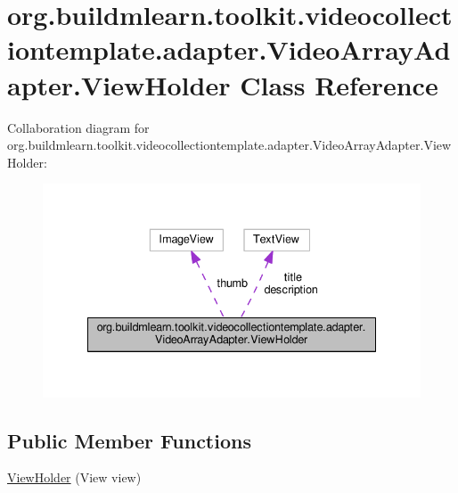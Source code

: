 \hypertarget{classorg_1_1buildmlearn_1_1toolkit_1_1videocollectiontemplate_1_1adapter_1_1VideoArrayAdapter_1_1ViewHolder}{}\section{org.\+buildmlearn.\+toolkit.\+videocollectiontemplate.\+adapter.\+Video\+Array\+Adapter.\+View\+Holder Class Reference}
\label{classorg_1_1buildmlearn_1_1toolkit_1_1videocollectiontemplate_1_1adapter_1_1VideoArrayAdapter_1_1ViewHolder}


Collaboration diagram for org.\+buildmlearn.\+toolkit.\+videocollectiontemplate.\+adapter.\+Video\+Array\+Adapter.\+View\+Holder\+:
\nopagebreak
\begin{figure}[H]
\begin{center}
\leavevmode
\includegraphics[width=335pt]{classorg_1_1buildmlearn_1_1toolkit_1_1videocollectiontemplate_1_1adapter_1_1VideoArrayAdapter_1_1ViewHolder__coll__graph}
\end{center}
\end{figure}
\subsection*{Public Member Functions}
\begin{DoxyCompactItemize}
\item 
\hyperlink{classorg_1_1buildmlearn_1_1toolkit_1_1videocollectiontemplate_1_1adapter_1_1VideoArrayAdapter_1_1ViewHolder_ac8570cba721e5339e8039cbf92ae068b}{View\+Holder} (View view)
\end{DoxyCompactItemize}
